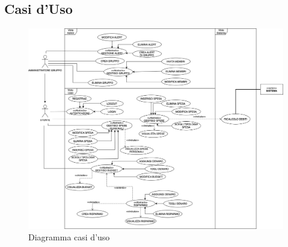 \subsection{Casi d'Uso}

    \begin{figure}[h]
        \centering
        \includegraphics[width=1\textwidth, trim=3cm 0cm 1cm 0cm]{images/DiagrammaCasiDusoV2.2.png}
        \caption{Diagramma casi d'uso }
    \end{figure}
